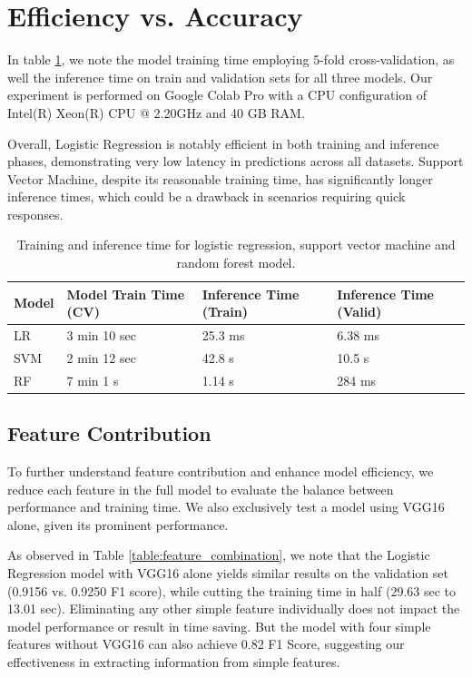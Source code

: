 \documentclass[11pt]{article}
\begin{document}
\section{Efficiency vs. Accuracy}
In table \ref{table: time}, we note the model training time employing 5-fold cross-validation, as well the inference time on train and validation sets for all three models. Our experiment is performed on Google Colab Pro with a CPU configuration of Intel(R) Xeon(R) CPU @ 2.20GHz and 40 GB RAM. 

Overall, Logistic Regression is notably efficient in both training and inference phases, demonstrating very low latency in predictions across all datasets. Support Vector Machine, despite its reasonable training time, has significantly longer inference times, which could be a drawback in scenarios requiring quick responses. 

\begin{table}[h!]
    \centering
    \begin{tabular}{|p{3cm}|p{3cm}|p{3cm}|p{3cm}|}
        \hline
        \textbf{Model} & \textbf{Model Train Time (CV)} & \textbf{Inference Time (Train)} & \textbf{Inference Time (Valid)} \\
        \hline
        LR & 3 min 10 sec & 25.3 ms & 6.38 ms \\
        \hline
        SVM & 2 min 12 sec & 42.8 s & 10.5 s \\
        \hline
        RF & 7 min 1 s & 1.14 s & 284 ms \\
        \hline
    \end{tabular}
    \caption{Training and inference time for logistic regression, support vector machine and random forest model.}
    \label{table: time}
\end{table}


\subsection{Feature Contribution}
To further understand feature contribution and enhance model efficiency, we reduce each feature in the full model to evaluate the balance between performance and training time. We also exclusively test a model using VGG16 alone, given its prominent performance.

As observed in Table \ref{table:feature_combination}, we note that the Logistic Regression model with VGG16 alone yields similar results on the validation set (0.9156 vs. 0.9250 F1 score), while cutting the training time in half (29.63 sec to 13.01 sec). Eliminating any other simple feature individually does not impact the model performance or result in time saving. But the model with four simple features without VGG16 can also achieve 0.82 F1 Score, suggesting our effectiveness in extracting information from simple features.
\end{document}
